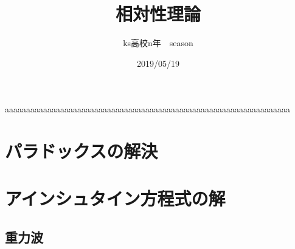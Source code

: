 \documentclass{jsarticle}
\begin{document}
\title{相対性理論}
\author{ks高校n年　season}
\date{2019/05/19}
\maketitle
\newcommand{\repart}[1]{\part{#1}\setcounter{section}{0}}
\newcommand{\lr}[1]{\left(#1 \right)}
\newcommand{\mlr}[1]{\left\{#1 \right\}}
\newcommand{\llr}[1]{\left[#1 \right]}
\newcommand{\rec}[1]{\frac{1}{#1}}
\newcommand{\de}[2][]{\frac{d #1}{d #2}}
\newcommand{\dd}[2][]{\frac{d^2 #1}{d #2^2}}
\newcommand{\pd}[2][]{\frac{\partial #1}{\partial #2}}
\newcommand{\ppd}[3]{\frac{\partial^2 #1}{\partial #2\partial #3}}
\newcommand{\pmat}[1]{\begin{pmatrix} #1 \end{pmatrix}}
\newcommand{\co}[1][]{\cos^{#1}\theta}
\newcommand{\si}[1][]{\sin^{#1}\theta}
\newcommand{\ga}{\gamma}
\newcommand{\Ga}{\Gamma}
\newcommand{\chr}[2]{\Gamma^{#1}_{#2}}
\newcommand{\ricci}[2]{R^{#1}_{#2}}
\newcommand{\grad}{\mathrm{grad}}
\newcommand{\dive}{\mathrm{div}}
\newcommand{\rot}{\mathrm{rot}}
\newcommand{\pa}{\partial}
\newcommand{\na}{\nabla}
aaaaaaaaaaaaaaaaaaaaaaaaaaaaaaaaaaaaaaaaaaaaaaaaaaaaaaaaaaaaaaaaaaa
    \section{パラドックスの解決}
    \section{アインシュタイン方程式の解}
    	\subsection{重力波}
\end{document}
